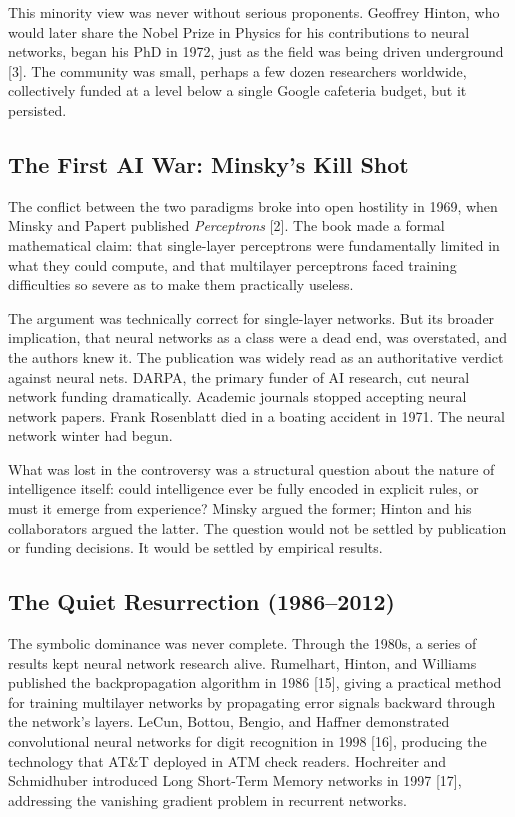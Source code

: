 \documentclass[12pt]{article}
\begin{document}
This minority view was never without serious proponents. Geoffrey
Hinton, who would later share the Nobel Prize in Physics for his
contributions to neural networks, began his PhD in 1972, just as the
field was being driven underground {[}3{]}. The community was small,
perhaps a few dozen researchers worldwide, collectively funded at a
level below a single Google cafeteria budget, but it persisted.

\subsection{The First AI War: Minsky's Kill Shot}\label{the-first-ai-war-minskys-kill-shot}

The conflict between the two paradigms broke into open hostility in
1969, when Minsky and Papert published \emph{Perceptrons} {[}2{]}. The
book made a formal mathematical claim: that single-layer perceptrons
were fundamentally limited in what they could compute, and that
multilayer perceptrons faced training difficulties so severe as to make
them practically useless.

The argument was technically correct for single-layer networks. But its
broader implication, that neural networks as a class were a dead end,
was overstated, and the authors knew it. The publication was widely read
as an authoritative verdict against neural nets. DARPA, the primary
funder of AI research, cut neural network funding dramatically. Academic
journals stopped accepting neural network papers. Frank Rosenblatt died
in a boating accident in 1971. The neural network winter had begun.

What was lost in the controversy was a structural question about the
nature of intelligence itself: could intelligence ever be fully encoded
in explicit rules, or must it emerge from experience? Minsky argued the
former; Hinton and his collaborators argued the latter. The question
would not be settled by publication or funding decisions. It would be
settled by empirical results.

\subsection{The Quiet Resurrection (1986--2012)}\label{the-quiet-resurrection-19862012}

The symbolic dominance was never complete. Through the 1980s, a series
of results kept neural network research alive. Rumelhart, Hinton, and
Williams published the backpropagation algorithm in 1986 {[}15{]},
giving a practical method for training multilayer networks by
propagating error signals backward through the network's layers. LeCun,
Bottou, Bengio, and Haffner demonstrated convolutional neural networks
for digit recognition in 1998 {[}16{]}, producing the technology that
AT\&T deployed in ATM check readers. Hochreiter and Schmidhuber
introduced Long Short-Term Memory networks in 1997 {[}17{]}, addressing
the vanishing gradient problem in recurrent networks.
\end{document}
